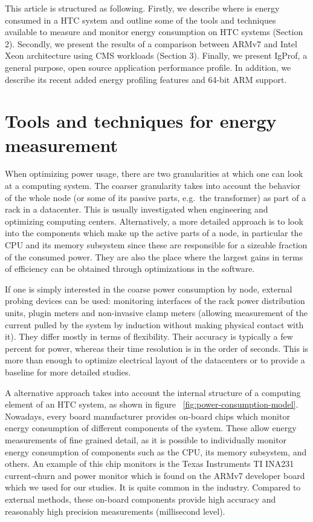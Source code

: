 \documentclass[a4paper]{jpconf}
\begin{document}
This article is structured as following. Firstly, we describe where
is energy consumed in a HTC system and outline some of
the tools and techniques available to measure and monitor energy
consumption on HTC systems (Section 2). Secondly, we present the results of a
comparison between ARMv7 and Intel Xeon architecture using CMS
workloads (Section 3). Finally, we present IgProf, a general purpose, open source
 application performance profile. In addition, we describe its recent added 
energy profiling features and 64-bit ARM support.

\section{Tools and techniques for energy measurement}

When optimizing power usage, there are two granularities at which
one can look at a computing system. The coarser granularity
takes into account the behavior of the whole node (or
some of its passive parts, e.g.\ the transformer) as part of a rack
in a datacenter. This is usually investigated when
engineering and optimizing computing centers. Alternatively,
a more detailed approach is to
look into the components which make up the active parts of a
node, in particular the CPU and its memory subsystem since these
are responsible for a sizeable fraction of the consumed power.
They are also the place where the largest gains in terms of efficiency 
can be obtained through optimizations in the software.

If one is simply interested in the coarse power consumption by node,
external probing devices can be used: monitoring interfaces
of the rack power distribution units, plugin meters and non-invasive
clamp meters (allowing measurement of the
current pulled by the system by induction without making physical
contact with it). They differ mostly in terms of flexibility.
Their accuracy is typically a few percent for power, whereas their time
resolution is in the order of seconds. This is more than enough
to optimize electrical layout of the datacenters or to provide a
baseline for more detailed studies.

A alternative approach takes into account the internal structure of a
computing element of an HTC system, as shown in figure 
~\ref{fig:power-consumption-model}. Nowadays, every board manufacturer
provides on-board chips which monitor energy consumption of
different components of the system. These
allow energy measurements of fine grained detail, as it is possible
to individually monitor energy consumption of components such as
the CPU, its memory subsystem, and others. An example of this chip
monitors is the Texas Instruments TI INA231~\cite{TIINA231} current-churn
and power monitor which is found on the ARMv7 developer board which
we used for our studies. It is quite common in the industry.
Compared to external methods, these on-board components provide
high accuracy and reasonably high precision measurements (millisecond
level).
\end{document}
